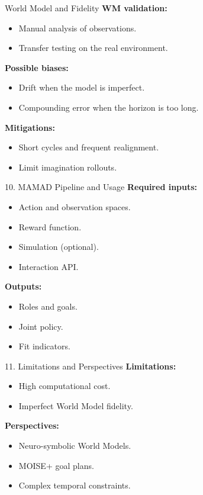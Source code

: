 \begin{frame}{World Model and Fidelity}
    \textbf{WM validation:}
    \begin{itemize}
        \item Manual analysis of observations.
        \item Transfer testing on the real environment.
    \end{itemize}

    \textbf{Possible biases:}
    \begin{itemize}
        \item Drift when the model is imperfect.
        \item Compounding error when the horizon is too long.
    \end{itemize}

    \textbf{Mitigations:}
    \begin{itemize}
        \item Short cycles and frequent realignment.
        \item Limit imagination rollouts.
    \end{itemize}
\end{frame}

\begin{frame}{10. MAMAD Pipeline and Usage}
    \textbf{Required inputs:}
    \begin{itemize}
        \item Action and observation spaces.
        \item Reward function.
        \item Simulation (optional).
        \item Interaction API.
    \end{itemize}

    \textbf{Outputs:}
    \begin{itemize}
        \item Roles and goals.
        \item Joint policy.
        \item Fit indicators.
    \end{itemize}
\end{frame}

\begin{frame}{11. Limitations and Perspectives}
    \textbf{Limitations:}
    \begin{itemize}
        \item High computational cost.
        \item Imperfect World Model fidelity.
    \end{itemize}

    \textbf{Perspectives:}
    \begin{itemize}
        \item Neuro-symbolic World Models.
        \item MOISE+ goal plans.
        \item Complex temporal constraints.
    \end{itemize}
\end{frame}

